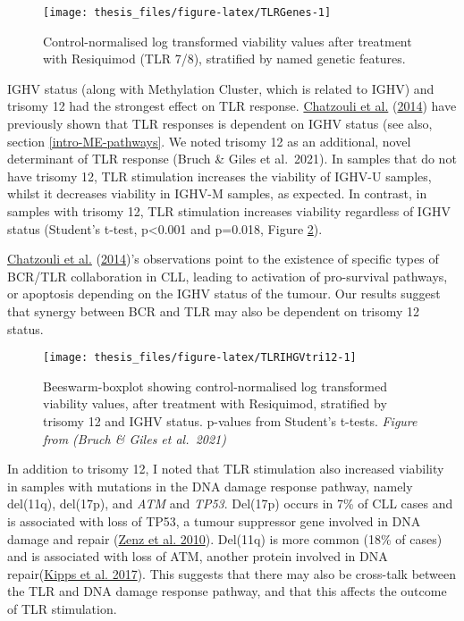 \documentclass[11pt, a4paper, twosided]{book}
\begin{document}
\begin{figure}

{\centering \texttt{[image: thesis\_files/figure-latex/TLRGenes-1]} 

}

\caption{Control-normalised log transformed viability values after treatment with Resiquimod (TLR 7/8), stratified by named genetic features.}\label{fig:TLRGenes}
\end{figure}
IGHV status (along with Methylation Cluster, which is related to IGHV) and trisomy 12 had the strongest effect on TLR response. \protect\hyperlink{ref-Chatzouli2014}{Chatzouli et al.} (\protect\hyperlink{ref-Chatzouli2014}{2014}) have previously shown that TLR responses is dependent on IGHV status (see also, section \ref{intro-ME-pathways}. We noted trisomy 12 as an additional, novel determinant of TLR response (Bruch \& Giles et al.~2021). In samples that do not have trisomy 12, TLR stimulation increases the viability of IGHV-U samples, whilst it decreases viability in IGHV-M samples, as expected. In contrast, in samples with trisomy 12, TLR stimulation increases viability regardless of IGHV status (Student's t-test, p\textless0.001 and p=0.018, Figure \ref{fig:TLRIHGVtri12}).

\protect\hyperlink{ref-Chatzouli2014}{Chatzouli et al.} (\protect\hyperlink{ref-Chatzouli2014}{2014})'s observations point to the existence of specific types of BCR/TLR collaboration in CLL, leading to activation of pro-survival pathways, or apoptosis depending on the IGHV status of the tumour. Our results suggest that synergy between BCR and TLR may also be dependent on trisomy 12 status.


\begin{figure}

{\centering \texttt{[image: thesis\_files/figure-latex/TLRIHGVtri12-1]} 

}

\caption{Beeswarm-boxplot showing control-normalised log transformed viability values, after treatment with Resiquimod, stratified by trisomy 12 and IGHV status. p-values from Student's t-tests. \emph{Figure from (Bruch \& Giles et al.~2021)}}\label{fig:TLRIHGVtri12}
\end{figure}
In addition to trisomy 12, I noted that TLR stimulation also increased viability in samples with mutations in the DNA damage response pathway, namely del(11q), del(17p), and \emph{ATM} and \emph{TP53}. Del(17p) occurs in 7\% of CLL cases and is associated with loss of TP53, a tumour suppressor gene involved in DNA damage and repair (\protect\hyperlink{ref-Zenz2010}{Zenz et al. 2010}). Del(11q) is more common (18\% of cases) and is associated with loss of ATM, another protein involved in DNA repair(\protect\hyperlink{ref-Kipps2017}{Kipps et al. 2017}). This suggests that there may also be cross-talk between the TLR and DNA damage response pathway, and that this affects the outcome of TLR stimulation.
\end{document}
